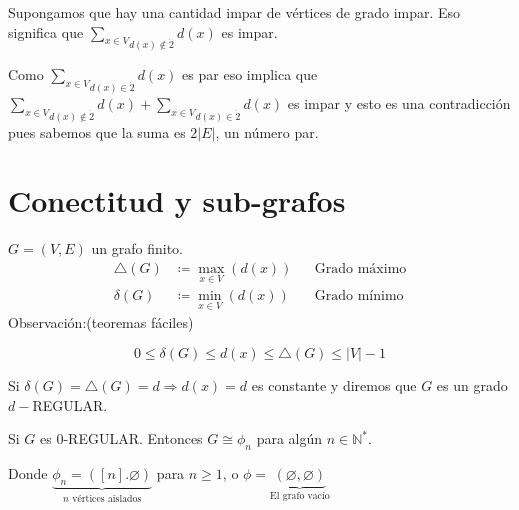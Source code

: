 \documentclass[../main.tex]{subfiles}
\begin{document}
Supongamos que hay una cantidad impar de vértices de grado impar.
Eso significa que
\(
	\underset
	{
		d(x)\notin\dot{2}
	}
	{
		\sum_{x\in V}
	}d(x)
\)
es impar.

Como
\(
	\underset
	{
		d(x)\in\dot{2}
	}
	{
		\sum_{x\in V}
	}d(x)
\)
es par eso implica que
\(
	\underset
	{
		d(x)\notin\dot{2}
	}
	{
		\sum_{x\in V}
	}d(x)
	+
	\underset
	{
		d(x)\in\dot{2}
	}
	{
		\sum_{x\in V}
	}d(x)
\)
es impar y esto es una contradicción pues sabemos que la suma es $2|E|$,
un número par.

\section{Conectitud y sub-grafos}%
\label{sec:conectitud_y_sub_grafos}

$G=(V,E)$ un grafo finito.
\begin{align*}
	\triangle(G)&\coloneqq\max_{x\in V}(d(x)) && \text{Grado máximo}\\
	\delta(G)&\coloneqq \min_{x\in V}(d(x)) && \text{Grado mínimo}
\end{align*}
Observación:(teoremas fáciles)

\[
	0\leq \delta(G) \leq d(x) \leq \triangle(G) \leq |V| - 1
\]

Si $\delta(G)=\triangle(G)=d\Longrightarrow d(x)=d$ es constante
y diremos que $G$ es un grado $d-$REGULAR.

Si $G$ es 0-REGULAR.
Entonces $G\cong \phi_n$ para algún $n\in \mathbb{N}^*$.

Donde
\(
	\underbrace
	{
		\phi_n=([n].\varnothing)
	}_
	{
		n\text{ vértices aislados}
	}
\)
para $n\geq 1$,
o
\(
	\phi =
	\underbrace
	{
		(\varnothing,\varnothing)
	}_
	{
		\text{El grafo vacío}
	}
\)

\begin{figure}[H]
	\centering
	
\end{figure}
\end{document}
